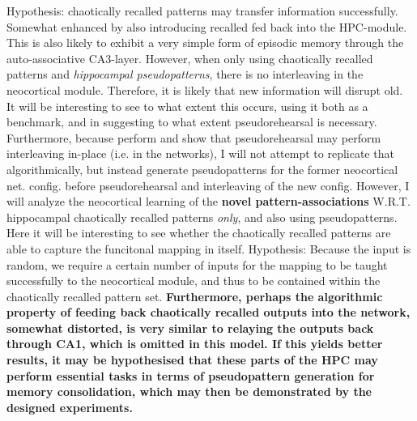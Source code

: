 Hypothesis: chaotically recalled patterns may transfer information successfully. Somewhat enhanced by also introducing recalled fed back into the HPC-module. This is also likely to exhibit a very simple form of episodic memory through the auto-associative CA3-layer. However, when only using chaotically recalled patterns and \textit{hippocampal pseudopatterns}, there is no interleaving in the neocortical module. Therefore, it is likely that new information will disrupt old. It will be interesting to see to what extent this occurs, using it both as a benchmark, and in suggesting to what extent pseudorehearsal is necessary. Furthermore, because \cite{Ans1997} perform and show that pseudorehearsal may perform interleaving in-place (i.e. in the networks), I will not attempt to replicate that algorithmically, but instead generate pseudopatterns for the former neocortical net. config. before pseudorehearsal and interleaving of the new config. However, I will analyze the neocortical learning of the \textbf{novel pattern-associations} W.R.T. hippocampal chaotically recalled patterns \textit{only}, and also using pseudopatterns. Here it will be interesting to see whether the chaotically recalled patterns are able to capture the funcitonal mapping in itself. Hypothesis: Because the input is random, we require a certain number of inputs for the mapping to be taught successfully to the neocortical module, and thus to be contained within the chaotically recalled pattern set. \textbf{Furthermore, perhaps the algorithmic property of feeding back chaotically recalled outputs into the network, somewhat distorted, is very similar to relaying the outputs back through CA1, which is omitted in this model. If this yields better results, it may be hypothesised that these parts of the HPC may perform essential tasks in terms of pseudopattern generation for memory consolidation, which may then be demonstrated by the designed experiments.}


\cleardoublepage
